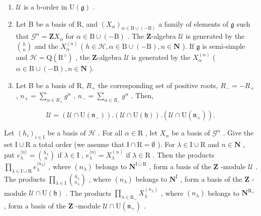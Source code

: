 \begin{enumerate}
\def\labelenumi{(\roman{enumi})}
\item
  \(\mathcal{U}\) is a b-order in \(\mathrm{U}(\mathfrak{g})\) .
\item
  Let B be a basis of \(\mathrm{R}\), and \((X_{\alpha})_{\alpha\in\mathrm{B}\cup(-\mathrm{B})}\) a family of elements of \(\mathfrak{g}\) such that \(\mathcal{G}^{\alpha}=\mathbf{Z}X_{\alpha}\) for \(\alpha\in\mathrm{B}\cup(-\mathrm{B})\) . The \(\mathbf{Z}\)-algebra \(\mathcal{U}\) is generated by the \(\binom{h}{n}\) and the \(X_{\alpha}^{(n)}\) ( \(h\in\mathcal{H},\alpha\in\mathrm{B}\cup(-\mathrm{B}),n\in\mathbf{N}\) ). If \(\mathfrak{g}\) is semi-simple and \(\mathcal{H}=\mathrm{Q}(\mathrm{R}^{\vee})\) , the \(\mathbf{Z}\)-algebra \(\mathcal{U}\) is generated by the \(X_{\alpha}^{(n)}\) ( \(\alpha\in\mathrm{B}\cup(-\mathrm{B}),n\in\mathbf{N}\) ).
\item
  Let B be a basis of R, \(R_{+}\) the corresponding set of positive roots, \(R_{-} = -R_{+}\) , \(n_{+} = \sum_{\alpha \in R_{+}} g^{\alpha}\) , \(n_{-} = \sum_{\alpha \in R_{-}} g^{\alpha}\) . Then,
\end{enumerate}

\[
\mathcal {U} = (\mathcal {U} \cap \mathrm{U} (\mathfrak {n} _ {-})). (\mathcal {U} \cap \mathrm{U} (\mathfrak {h})). (\mathcal {U} \cap \mathrm{U} (\mathfrak {n} _ {+})).
\]

Let \((h_i)_{i\in \mathrm{I}}\) be a basis of \(\mathcal{H}\) . For all \(\alpha \in \mathrm{R}\) , let \(X_{\alpha}\) be a basis of \(\mathcal{G}^{\alpha}\) . Give the set \(\mathrm{I}\cup \mathrm{R}\) a total order (we assume that \(\mathrm{I}\cap \mathrm{R} = \emptyset\) ). For \(\lambda \in \mathrm{I}\cup \mathrm{R}\) and \(n\in \mathbf{N}\) , put \(e_{\lambda}^{\langle n\rangle} = \binom{h_{\lambda}}{n}\) if \(\lambda \in \mathrm{I}\) , \(e_{\lambda}^{\langle n\rangle} = X_{\lambda}^{(n)}\) if \(\lambda \in \mathrm{R}\) . Then the products \(\prod_{\lambda \in \mathrm{I}\cup \mathrm{R}}e_{\lambda}^{\langle n_{\lambda}\rangle}\) , where \((n_{\lambda})\) belongs to \(\mathbf{N}^{\mathrm{I}\cup \mathrm{R}}\) , form a basis of the \(\mathbf{Z}\) -module \(\mathcal{U}\) . The products \(\prod_{\lambda \in \mathrm{I}}\binom{h_{\lambda}}{n_{\lambda}}\) , where \((n_{\lambda})\) belongs to \(\mathbf{N}^{\mathrm{I}}\) , form a basis of the \(\mathbf{Z}\) -module \(\mathcal{U}\cap \mathrm{U}(\mathfrak{h})\) . The products \(\prod_{\lambda \in \mathrm{R}_{+}}X_{\lambda}^{(n_{\lambda})}\) , where \((n_{\lambda})\) belongs to \(\mathbf{N}^{\mathrm{R}_{+}}\) , form a basis of the \(\mathbf{Z}\) -module \(\mathcal{U}\cap \mathrm{U}(\mathfrak{n}_{+})\) .


